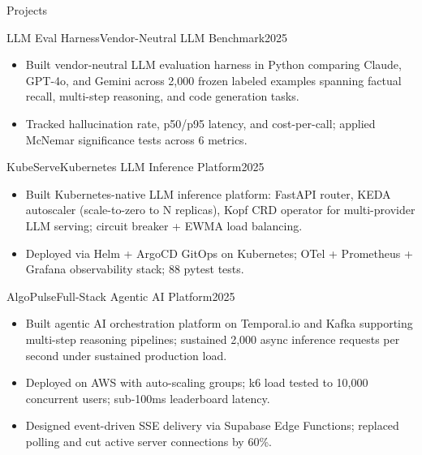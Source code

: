 \documentclass[]{mcdowellcv}
\begin{document}
\begin{cvsection}{Projects}
  \begin{cvsubsection}{LLM Eval Harness}{Vendor-Neutral LLM Benchmark}{2025}
    \begin{itemize}
      \item Built vendor-neutral LLM evaluation harness in Python comparing Claude, GPT-4o, and Gemini across 2,000 frozen labeled examples spanning factual recall, multi-step reasoning, and code generation tasks.
      \item Tracked hallucination rate, p50/p95 latency, and cost-per-call; applied McNemar significance tests across 6 metrics.
    \end{itemize}
    \vspace{-1.5pt}
  \end{cvsubsection}

  \begin{cvsubsection}{KubeServe}{Kubernetes LLM Inference Platform}{2025}
    \begin{itemize}
      \item Built Kubernetes-native LLM inference platform: FastAPI router, KEDA autoscaler (scale-to-zero to N replicas), Kopf CRD operator for multi-provider LLM serving; circuit breaker + EWMA load balancing.
      \item Deployed via Helm + ArgoCD GitOps on Kubernetes; OTel + Prometheus + Grafana observability stack; 88 pytest tests.
    \end{itemize}
    \vspace{-1.5pt}
  \end{cvsubsection}

  \begin{cvsubsection}{AlgoPulse}{Full-Stack Agentic AI Platform}{2025}
    \begin{itemize}
      \item Built agentic AI orchestration platform on Temporal.io and Kafka supporting multi-step reasoning pipelines; sustained 2,000 async inference requests per second under sustained production load.
      \item Deployed on AWS with auto-scaling groups; k6 load tested to 10,000 concurrent users; sub-100ms leaderboard latency.
      \item Designed event-driven SSE delivery via Supabase Edge Functions; replaced polling and cut active server connections by 60\%.
    \end{itemize}
    \vspace{-1.5pt}
  \end{cvsubsection}
\end{cvsection}
\end{document}
